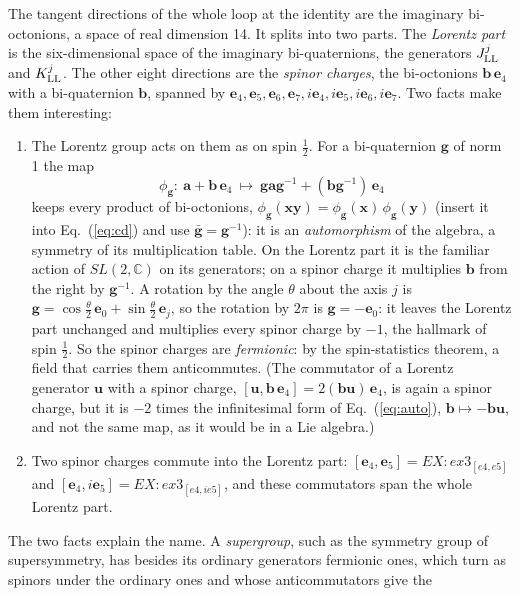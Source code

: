 \documentclass[aps,prd,twocolumn,superscriptaddress,nofootinbib,floatfix,longbibliography]{revtex4-2}
\newcommand{\LL}{{\rm LL}}
\newcommand{\e}[1]{\mathbf e_{#1}}
\begin{document}
The tangent directions of the whole loop at the identity are the imaginary bi-octonions, a space of real dimension 14.
It splits into two parts. The \emph{Lorentz part} is the six-dimensional space of the imaginary bi-quaternions, the
generators $J^j_\LL$ and $K^j_\LL$. The other eight directions are the \emph{spinor charges}, the bi-octonions
$\mathbf b\,\e4$ with a bi-quaternion $\mathbf b$, spanned by $\e4,\e5,\e6,\e7,i\e4,i\e5,i\e6,i\e7$. Two facts make
them interesting:
\begin{enumerate}
\item The Lorentz group acts on them as on spin $\frac12$. For a bi-quaternion $\mathbf g$ of norm 1 the map
\begin{equation}
\phi_{\mathbf g}:\ \mathbf a+\mathbf b\,\e4\ \mapsto\ \mathbf g\mathbf a\mathbf g^{-1}+(\mathbf b\mathbf g^{-1})\,\e4
\label{eq:auto}
\end{equation}
keeps every product of bi-octonions, $\phi_{\mathbf g}(\mathbf x\mathbf y)=\phi_{\mathbf g}(\mathbf x)\,\phi_{\mathbf
g}(\mathbf y)$ (insert it into Eq.~(\ref{eq:cd}) and use $\bar{\mathbf g}=\mathbf g^{-1}$): it is an \emph{automorphism}
of the algebra, a symmetry of its multiplication table. On the Lorentz part it is the familiar action of $SL(2,\mathbb C)$
on its generators; on a spinor charge it multiplies $\mathbf b$ from the right by $\mathbf g^{-1}$. A rotation by the angle
$\theta$ about the axis $j$ is $\mathbf g=\cos\frac\theta2\,\e0+\sin\frac\theta2\,\e j$, so the rotation by $2\pi$ is
$\mathbf g=-\e0$: it leaves the Lorentz part unchanged and multiplies every spinor charge by $-1$, the hallmark of spin
$\frac12$. So the spinor charges are \emph{fermionic}: by the spin-statistics theorem, a field that carries them
anticommutes. (The commutator of a Lorentz generator $\mathbf u$ with a spinor charge, $[\mathbf u,\mathbf
b\,\e4]=2(\mathbf b\mathbf u)\,\e4$, is again a spinor charge, but it is $-2$ times the infinitesimal form of
Eq.~(\ref{eq:auto}), $\mathbf b\mapsto-\mathbf b\mathbf u$, and not the same map, as it would be in a Lie algebra.)
\item Two spinor charges commute into the Lorentz part: $[\e4,\e5]={{EX:ex3_[e4,e5]}}$ and $[\e4,i\e5]={{EX:ex3_[e4,i e5]}}$,
and these commutators span the whole Lorentz part.
\end{enumerate}
The two facts explain the name. A \emph{supergroup}, such as the symmetry group of supersymmetry, has besides its
ordinary generators fermionic ones, which turn as spinors under the ordinary ones and whose anticommutators give the
\end{document}
